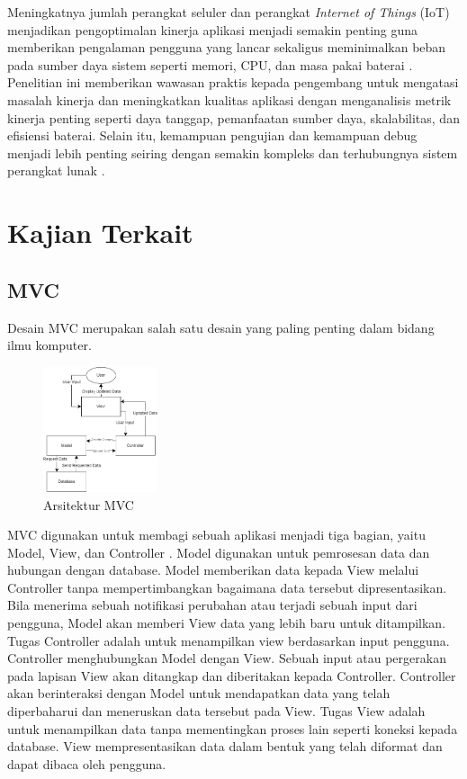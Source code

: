 \documentclass[conference]{IEEEtran}
\begin{document}
Meningkatnya jumlah perangkat seluler dan perangkat \textit{Internet of Things} (IoT) menjadikan pengoptimalan kinerja aplikasi menjadi semakin penting guna memberikan pengalaman pengguna yang lancar sekaligus meminimalkan beban pada sumber daya sistem seperti memori, CPU, dan masa pakai baterai \cite{Anhar_Swari_Aditiawan_2024}. Penelitian ini memberikan wawasan praktis kepada pengembang untuk mengatasi masalah kinerja dan meningkatkan kualitas aplikasi dengan menganalisis metrik kinerja penting seperti daya tanggap, pemanfaatan sumber daya, skalabilitas, dan efisiensi baterai. Selain itu, kemampuan pengujian dan kemampuan debug menjadi lebih penting seiring dengan semakin kompleks dan terhubungnya sistem perangkat lunak \cite{Gunawan_Lawi_Adnan_2016}.


 

\section{Kajian Terkait}
\subsection{MVC}
Desain MVC merupakan salah satu desain yang paling penting dalam bidang ilmu komputer\cite{bucanek2009model}.
\begin{figure}[h]
    \centering
    \includegraphics[width = 0.3\textwidth
    ]{images/MVC1.png}
    \caption{Arsitektur MVC}
    \label{fig:enter-label}
\end{figure}

MVC digunakan untuk membagi sebuah aplikasi menjadi tiga bagian, yaitu Model, View, dan Controller \cite{qureshi2014comparison}. Model digunakan untuk pemrosesan data dan hubungan dengan database. Model memberikan data kepada View melalui Controller tanpa mempertimbangkan bagaimana data tersebut dipresentasikan. Bila menerima sebuah notifikasi perubahan atau terjadi sebuah input dari pengguna, Model akan memberi View data yang lebih baru untuk ditampilkan. Tugas Controller adalah untuk menampilkan view berdasarkan input pengguna. Controller menghubungkan Model dengan View. Sebuah input atau pergerakan pada lapisan View akan ditangkap dan diberitakan kepada Controller. Controller akan berinteraksi dengan Model untuk mendapatkan data yang telah diperbaharui dan meneruskan data tersebut pada View. Tugas View adalah untuk menampilkan data tanpa mementingkan proses lain seperti koneksi kepada database. View mempresentasikan data dalam bentuk yang telah diformat dan dapat dibaca oleh pengguna.
\end{document}
